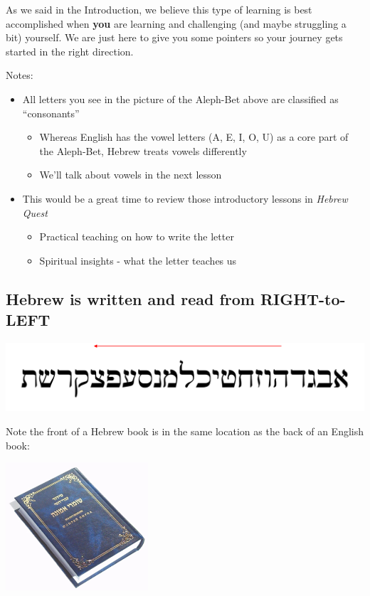 \documentclass[
]{turabian-researchpaper}
\providecommand{\tightlist}{%
  \setlength{\itemsep}{0pt}\setlength{\parskip}{0pt}}
\begin{document}
As we said in the Introduction, we believe this type of learning is best accomplished when \textbf{you} are learning and challenging (and maybe struggling a bit) yourself. We are just here to give you some pointers so your journey gets started in the right direction.

Notes:

\begin{itemize}
\tightlist
\item
  All letters you see in the picture of the Aleph-Bet above are classified as ``consonants''

  \begin{itemize}
  \tightlist
  \item
    Whereas English has the vowel letters (A, E, I, O, U) as a core part of the Aleph-Bet, Hebrew treats vowels differently
  \item
    We'll talk about vowels in the next lesson
  \end{itemize}
\item
  This would be a great time to review those introductory lessons in \emph{Hebrew Quest}

  \begin{itemize}
  \tightlist
  \item
    Practical teaching on how to write the letter
  \item
    Spiritual insights - what the letter teaches us
  \end{itemize}
\end{itemize}

\hypertarget{one_2}{%
\subsection{Hebrew is written and read from RIGHT-to-LEFT}\label{one_2}}

\begin{center}\includegraphics[width=400pt]{images/right_to_left} \end{center}

Note the front of a Hebrew book is in the same location as the back of an English book:

\begin{center}\includegraphics[width=150pt]{images/hebrewbook} \end{center}
\end{document}
